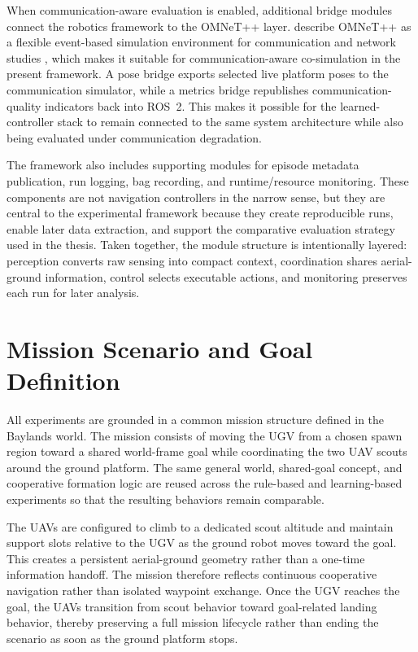 When communication-aware evaluation is enabled, additional bridge modules connect the robotics framework to the OMNeT++ layer. \citeauthor{varga2008omnet} describe OMNeT++ as a flexible event-based simulation environment for communication and network studies \citep{varga2008omnet}, which makes it suitable for communication-aware co-simulation in the present framework. A pose bridge exports selected live platform poses to the communication simulator, while a metrics bridge republishes communication-quality indicators back into ROS~2. This makes it possible for the learned-controller stack to remain connected to the same system architecture while also being evaluated under communication degradation.

The framework also includes supporting modules for episode metadata publication, run logging, bag recording, and runtime/resource monitoring. These components are not navigation controllers in the narrow sense, but they are central to the experimental framework because they create reproducible runs, enable later data extraction, and support the comparative evaluation strategy used in the thesis. Taken together, the module structure is intentionally layered: perception converts raw sensing into compact context, coordination shares aerial-ground information, control selects executable actions, and monitoring preserves each run for later analysis.

\section{Mission Scenario and Goal Definition}

All experiments are grounded in a common mission structure defined in the Baylands world. The mission consists of moving the UGV from a chosen spawn region toward a shared world-frame goal while coordinating the two UAV scouts around the ground platform. The same general world, shared-goal concept, and cooperative formation logic are reused across the rule-based and learning-based experiments so that the resulting behaviors remain comparable.

The UAVs are configured to climb to a dedicated scout altitude and maintain support slots relative to the UGV as the ground robot moves toward the goal. This creates a persistent aerial-ground geometry rather than a one-time information handoff. The mission therefore reflects continuous cooperative navigation rather than isolated waypoint exchange. Once the UGV reaches the goal, the UAVs transition from scout behavior toward goal-related landing behavior, thereby preserving a full mission lifecycle rather than ending the scenario as soon as the ground platform stops.

